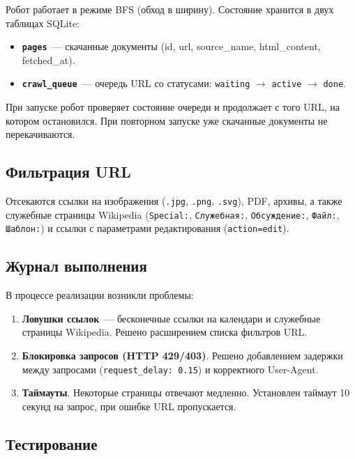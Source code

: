 \documentclass[12pt,a4paper]{article}
\begin{document}
Робот работает в режиме BFS (обход в ширину). Состояние хранится в двух таблицах SQLite:

\begin{itemize}
    \item \textbf{\texttt{pages}}~--- скачанные документы (id, url, source\_name, html\_content, fetched\_at).
    \item \textbf{\texttt{crawl\_queue}}~--- очередь URL со статусами: \texttt{waiting} $\to$ \texttt{active} $\to$ \texttt{done}.
\end{itemize}

При запуске робот проверяет состояние очереди и продолжает с того URL, на котором остановился. При повторном запуске уже скачанные документы не перекачиваются.

\subsection{Фильтрация URL}

Отсекаются ссылки на изображения (\texttt{.jpg}, \texttt{.png}, \texttt{.svg}), PDF, архивы, а также служебные страницы Wikipedia (\texttt{Special:}, \texttt{Служебная:}, \texttt{Обсуждение:}, \texttt{Файл:}, \texttt{Шаблон:}) и ссылки с параметрами редактирования (\texttt{action=edit}).

\subsection{Журнал выполнения}

В процессе реализации возникли проблемы:

\begin{enumerate}
    \item \textbf{Ловушки ссылок}~--- бесконечные ссылки на календари и служебные страницы Wikipedia. Решено расширением списка фильтров URL.

    \item \textbf{Блокировка запросов (HTTP 429/403)}. Решено добавлением задержки между запросами (\texttt{request\_delay: 0.15}) и корректного User-Agent.

    \item \textbf{Таймауты}. Некоторые страницы отвечают медленно. Установлен таймаут 10 секунд на запрос, при ошибке URL пропускается.
\end{enumerate}

\subsection{Тестирование}
\end{document}
